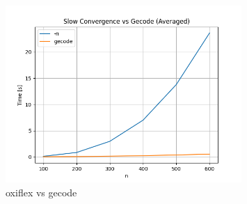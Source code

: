 \begin{figure}[ht]
	\centering
	\includegraphics[width=0.8\textwidth]{./Problems/slow_convergence/plots/gecode.png}
	\caption{oxiflex vs gecode}
	\label{fig:slow:gecode}
\end{figure}
